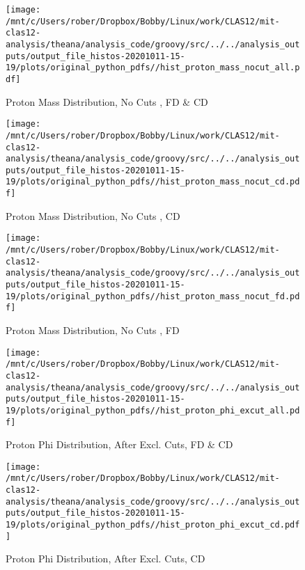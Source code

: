 \documentclass{article}
\begin{document}
\begin{landscape}
    \begin{figure}[h]
        \centering

        \texttt{[image: /mnt/c/Users/rober/Dropbox/Bobby/Linux/work/CLAS12/mit-clas12-analysis/theana/analysis\_code/groovy/src/../../analysis\_outputs/output\_file\_histos-20201011-15-19/plots/original\_python\_pdfs//hist\_proton\_mass\_nocut\_all.pdf]}
        \captionsetup{textformat=empty,labelformat=blank}
        \caption{Proton Mass Distribution, No Cuts , FD \& CD}
    \end{figure}
    \clearpage
    
    \begin{figure}[h]
        \centering

        \texttt{[image: /mnt/c/Users/rober/Dropbox/Bobby/Linux/work/CLAS12/mit-clas12-analysis/theana/analysis\_code/groovy/src/../../analysis\_outputs/output\_file\_histos-20201011-15-19/plots/original\_python\_pdfs//hist\_proton\_mass\_nocut\_cd.pdf]}
        \captionsetup{textformat=empty,labelformat=blank}
        \caption{Proton Mass Distribution, No Cuts , CD}
    \end{figure}
    \clearpage
    
    \begin{figure}[h]
        \centering

        \texttt{[image: /mnt/c/Users/rober/Dropbox/Bobby/Linux/work/CLAS12/mit-clas12-analysis/theana/analysis\_code/groovy/src/../../analysis\_outputs/output\_file\_histos-20201011-15-19/plots/original\_python\_pdfs//hist\_proton\_mass\_nocut\_fd.pdf]}
        \captionsetup{textformat=empty,labelformat=blank}
        \caption{Proton Mass Distribution, No Cuts , FD}
    \end{figure}
    \clearpage
    
    \begin{figure}[h]
        \centering

        \texttt{[image: /mnt/c/Users/rober/Dropbox/Bobby/Linux/work/CLAS12/mit-clas12-analysis/theana/analysis\_code/groovy/src/../../analysis\_outputs/output\_file\_histos-20201011-15-19/plots/original\_python\_pdfs//hist\_proton\_phi\_excut\_all.pdf]}
        \captionsetup{textformat=empty,labelformat=blank}
        \caption{Proton Phi Distribution, After Excl. Cuts, FD \& CD}
    \end{figure}
    \clearpage
    
    \begin{figure}[h]
        \centering

        \texttt{[image: /mnt/c/Users/rober/Dropbox/Bobby/Linux/work/CLAS12/mit-clas12-analysis/theana/analysis\_code/groovy/src/../../analysis\_outputs/output\_file\_histos-20201011-15-19/plots/original\_python\_pdfs//hist\_proton\_phi\_excut\_cd.pdf]}
        \captionsetup{textformat=empty,labelformat=blank}
        \caption{Proton Phi Distribution, After Excl. Cuts, CD}
    \end{figure}
    \clearpage
    

\end{landscape}
\end{document}
